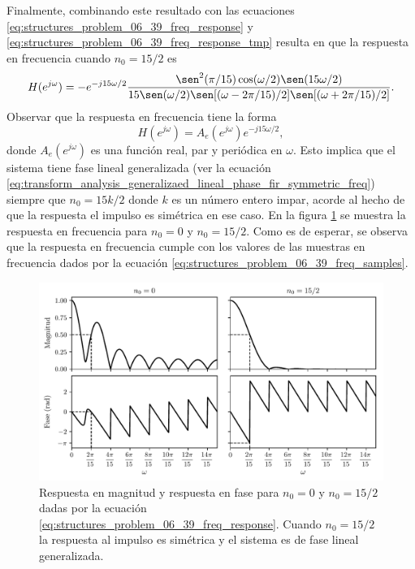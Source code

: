 \documentclass[a4paper]{report}
\begin{document}
Finalmente, combinando este resultado con las ecuaciones \ref{eq:structures_problem_06_39_freq_response} y \ref{eq:structures_problem_06_39_freq_response_tmp} resulta en que la respuesta en frecuencia cuando \(n_0=15/2\) es
\begin{equation}\label{eq:structures_problem_06_39_freq_response_symmetric}
 H(e^{j\omega})=-e^{-j15\omega/2}\dfrac{\sen^2(\pi/15)\cos(\omega/2)\sen(15\omega/2)}{15\sen(\omega/2)\sen[(\omega-2\pi/15)/2]\sen[(\omega+2\pi/15)/2]}. 
\end{equation}
Observar que la respuesta en frecuencia tiene la forma
\[
 H(e^{j\omega})=A_e(e^{j\omega})e^{-j15\omega/2},
\]
donde \(A_e(e^{j\omega})\) es una función real, par y periódica en \(\omega\). Esto implica que el sistema tiene fase lineal generalizada (ver la ecuación \ref{eq:transform_analysis_generalizaed_lineal_phase_fir_symmetric_freq}) siempre que \(n_0=15k/2\) donde \(k\) es un número entero impar, acorde al hecho de que la respuesta el impulso es simétrica en ese caso. En la figura \ref{fig:structures_problem_06_39_freq_response} se muestra la respuesta en frecuencia para \(n_0=0\) y \(n_0=15/2\). Como es de esperar, se observa que la respuesta en frecuencia cumple con los valores de las muestras en frecuencia dados por la ecuación \ref{eq:structures_problem_06_39_freq_samples}. 
\begin{figure}[!htb]
 \begin{center}
 \includegraphics[width=1\textwidth]{figuras/structures_problem_06_39_freq_response.pdf}
 \caption{\label{fig:structures_problem_06_39_freq_response} Respuesta en magnitud y respuesta en fase para \(n_0=0\) y \(n_0=15/2\) dadas por la ecuación \ref{eq:structures_problem_06_39_freq_response}. Cuando \(n_0=15/2\) la respuesta al impulso es simétrica y el sistema es de fase lineal generalizada.}
 \end{center}
\end{figure}
\end{document}
